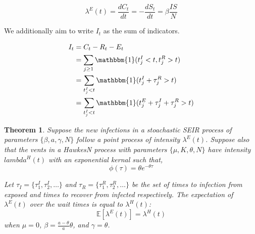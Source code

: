 \documentclass[12pt]{article}
\newtheorem{theorem}{Theorem}
\begin{document}
\begin{equation}
  \lambda^{E}(t) = \frac{d C_t}{dt} =  -\frac{dS_t}{dt} = \beta \frac{IS}{N}
\end{equation}

We additionally aim to write $I_t$ as the sum of indicators. 

\begin{align*}
  I_t &= C_t - R_t - E_t  \\
  &= \sum_{j \geq 1} \mathbbm{1} (t_j^I < t, t_j^R > t) \\
  &=  \sum_{t_j^I < t} \mathbbm{1} (t_j^I + \tau_j^R > t) \\
  &=  \sum_{t_j^I < t} \mathbbm{1} (t_j^E + \tau_j^I + \tau_j^R > t) 
\end{align*}



\begin{theorem}\label{thrm:SEIR}
  Suppose the new infections in a stoachastic SEIR process of parameters $\{\beta, a, \gamma, N\}$ follow a point process of intensity $\lambda^E(t)$. Suppose also that the vents in a HawkesN process with parameters $\{\mu, K, \theta, N\}$ have intensity $lambda^H(t)$ with an exponential kernal such that,
  \[
  \phi(\tau) = \theta e^{-\theta \tau}
  \]

  Let $\tau_I = \{\tau_1^I, \tau_2^I, \ldots\}$ and $\tau_R = \{\tau_1^R, \tau_2^R, \ldots\}$ be the set of times to infection from exposed and times to recover from infected respectively. The expectation of $\lambda^E(t)$ over the wait times is equal to $\lambda^H(t)$:
  \[
\mathbb{E}[\lambda^E(t)] = \lambda^H(t)
  \]
  when $\mu=0$, $\beta=\frac{a - \theta}{a} \theta$, and $\gamma = \theta$. 
\end{theorem}
\end{document}
